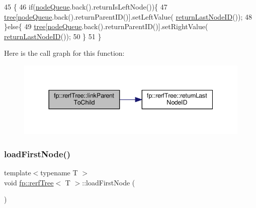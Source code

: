\begin{DoxyCode}
45                                                \{
46                     \textcolor{keywordflow}{if}(\hyperlink{classfp_1_1rerfTree_a59b3bdcba86acbe93fd46658132218a8}{nodeQueue}.back().returnIsLeftNode())\{
47                         \hyperlink{classfp_1_1rerfTree_afc9392154cb4d1dde02e26a9ec31e356}{tree}[\hyperlink{classfp_1_1rerfTree_a59b3bdcba86acbe93fd46658132218a8}{nodeQueue}.back().returnParentID()].setLeftValue(
      \hyperlink{classfp_1_1rerfTree_a99ed99d742ffd7f6f38487434a14b9ff}{returnLastNodeID}());
48                     \}\textcolor{keywordflow}{else}\{
49                         \hyperlink{classfp_1_1rerfTree_afc9392154cb4d1dde02e26a9ec31e356}{tree}[\hyperlink{classfp_1_1rerfTree_a59b3bdcba86acbe93fd46658132218a8}{nodeQueue}.back().returnParentID()].setRightValue(
      \hyperlink{classfp_1_1rerfTree_a99ed99d742ffd7f6f38487434a14b9ff}{returnLastNodeID}());
50                     \}
51                 \}
\end{DoxyCode}
Here is the call graph for this function\+:
\nopagebreak
\begin{figure}[H]
\begin{center}
\leavevmode
\includegraphics[width=344pt]{classfp_1_1rerfTree_a7750b048cb8beaada5279f3a702f6cc2_cgraph}
\end{center}
\end{figure}
\mbox{\label{classfp_1_1rerfTree_a00b09f0d455acaae7ae2d11db5d82478}} 
\subsubsection{\texorpdfstring{load\+First\+Node()}{loadFirstNode()}}
{\footnotesize\ttfamily template$<$typename T $>$ \\
void \hyperlink{classfp_1_1rerfTree}{fp\+::rerf\+Tree}$<$ T $>$\+::load\+First\+Node (\begin{DoxyParamCaption}{ }\end{DoxyParamCaption})\hspace{0.3cm}{\ttfamily [inline]}}



